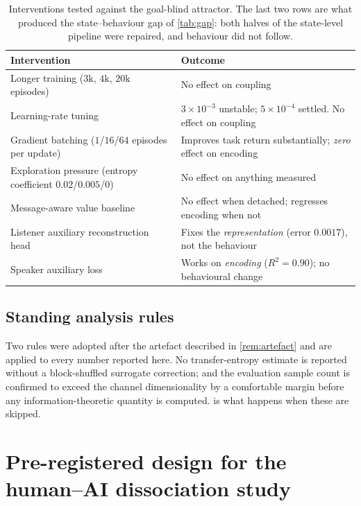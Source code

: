 \documentclass[11pt,a4paper]{article}
\theoremstyle{plain}
\theoremstyle{definition}
\theoremstyle{remark}
\begin{document}
\begin{appendices}
\begin{table}[h]
\centering
\small
\begin{tabular}{@{}p{}p{}@{}}
\toprule
\textbf{Intervention} & \textbf{Outcome} \\
\midrule
Longer training ($3\text{k}$, $4\text{k}$, $20\text{k}$ episodes) & No effect on coupling \\
Learning-rate tuning & $3\times10^{-3}$ unstable; $5\times10^{-4}$ settled. No effect on coupling \\
Gradient batching ($1$/$16$/$64$ episodes per update) & Improves task return substantially; \emph{zero} effect on encoding \\
Exploration pressure (entropy coefficient $0.02$/$0.005$/$0$) & No effect on anything measured \\
Message-aware value baseline & No effect when detached; regresses encoding when not \\
Listener auxiliary reconstruction head & Fixes the \emph{representation} (error $0.0017$), not the behaviour \\
Speaker auxiliary loss & Works on \emph{encoding} ($R^2 = 0.90$); no behavioural change \\
\bottomrule
\end{tabular}
\caption{Interventions tested against the goal-blind attractor. The last two rows are what produced the
state--behaviour gap of \cref{tab:gap}: both halves of the state-level pipeline were repaired, and behaviour did
not follow.}
\label{tab:escapes}
\end{table}

\subsection{Standing analysis rules}

Two rules were adopted after the artefact described in \cref{rem:artefact} and are applied to every number
reported here. No transfer-entropy estimate is reported without a block-shuffled surrogate correction; and the
evaluation sample count is confirmed to exceed the channel dimensionality by a comfortable margin before any
information-theoretic quantity is computed.  is what happens when these are skipped.

\section{Pre-registered design for the human--AI dissociation study}\label{app:humanai}


\end{appendices}
\end{document}
